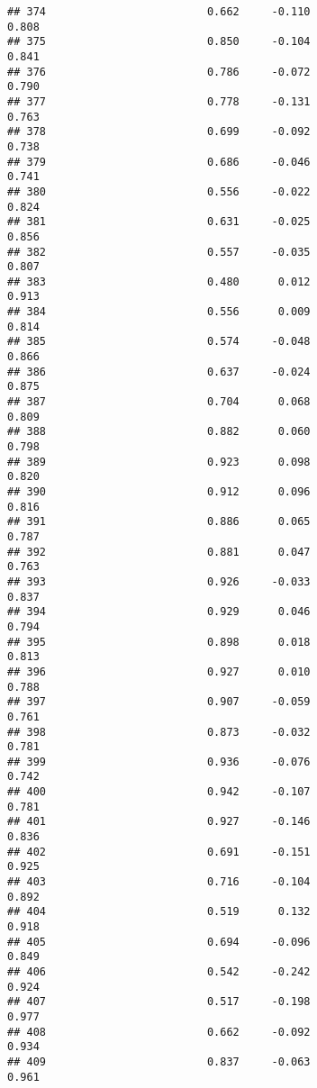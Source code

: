 \documentclass[
]{article}
\begin{document}
\begin{verbatim}
## 374                         0.662     -0.110                     0.808
## 375                         0.850     -0.104                     0.841
## 376                         0.786     -0.072                     0.790
## 377                         0.778     -0.131                     0.763
## 378                         0.699     -0.092                     0.738
## 379                         0.686     -0.046                     0.741
## 380                         0.556     -0.022                     0.824
## 381                         0.631     -0.025                     0.856
## 382                         0.557     -0.035                     0.807
## 383                         0.480      0.012                     0.913
## 384                         0.556      0.009                     0.814
## 385                         0.574     -0.048                     0.866
## 386                         0.637     -0.024                     0.875
## 387                         0.704      0.068                     0.809
## 388                         0.882      0.060                     0.798
## 389                         0.923      0.098                     0.820
## 390                         0.912      0.096                     0.816
## 391                         0.886      0.065                     0.787
## 392                         0.881      0.047                     0.763
## 393                         0.926     -0.033                     0.837
## 394                         0.929      0.046                     0.794
## 395                         0.898      0.018                     0.813
## 396                         0.927      0.010                     0.788
## 397                         0.907     -0.059                     0.761
## 398                         0.873     -0.032                     0.781
## 399                         0.936     -0.076                     0.742
## 400                         0.942     -0.107                     0.781
## 401                         0.927     -0.146                     0.836
## 402                         0.691     -0.151                     0.925
## 403                         0.716     -0.104                     0.892
## 404                         0.519      0.132                     0.918
## 405                         0.694     -0.096                     0.849
## 406                         0.542     -0.242                     0.924
## 407                         0.517     -0.198                     0.977
## 408                         0.662     -0.092                     0.934
## 409                         0.837     -0.063                     0.961

\end{verbatim}
\end{document}
